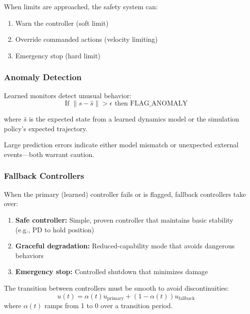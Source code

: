 When limits are approached, the safety system can:
\begin{enumerate}
    \item Warn the controller (soft limit)
    \item Override commanded actions (velocity limiting)
    \item Emergency stop (hard limit)
\end{enumerate}

\subsubsection{Anomaly Detection}

Learned monitors detect unusual behavior:
\begin{equation}
\text{If } \|s - \hat{s}\| > \epsilon \text{ then } \text{FLAG\_ANOMALY}
\end{equation}

where $\hat{s}$ is the expected state from a learned dynamics model or the simulation policy's expected trajectory.

Large prediction errors indicate either model mismatch or unexpected external events---both warrant caution.

\subsubsection{Fallback Controllers}

When the primary (learned) controller fails or is flagged, fallback controllers take over:

\begin{enumerate}
    \item \textbf{Safe controller:} Simple, proven controller that maintains basic stability (e.g., PD to hold position)
    \item \textbf{Graceful degradation:} Reduced-capability mode that avoids dangerous behaviors
    \item \textbf{Emergency stop:} Controlled shutdown that minimizes damage
\end{enumerate}

The transition between controllers must be smooth to avoid discontinuities:
\begin{equation}
u(t) = \alpha(t) u_{\text{primary}} + (1-\alpha(t)) u_{\text{fallback}}
\end{equation}
where $\alpha(t)$ ramps from 1 to 0 over a transition period.

